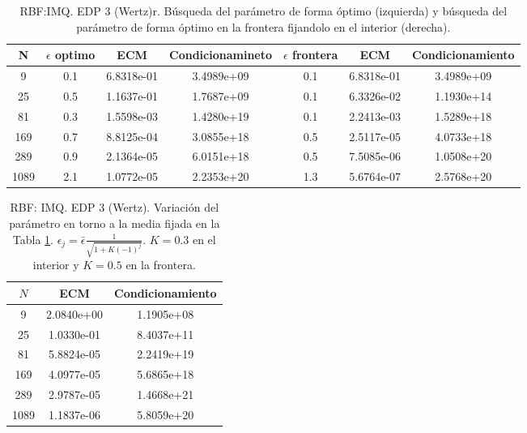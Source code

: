 \documentclass[11pt,a4paper]{article}
\begin{document}
\begin{table}
\begin{center}
\caption{RBF:IMQ.  EDP 3 (Wertz)r. Búsqueda del parámetro de forma óptimo (izquierda) y búsqueda del parámetro de forma óptimo en la frontera fijandolo en el interior (derecha).}
\begin{tabular}{|c|ccc|ccc|}
\hline 
N & $\epsilon$ optimo & ECM & Condicionamineto & $\epsilon$ frontera & ECM & Condicionamiento \\ 
\hline 
9 & 0.1 &6.8318e-01 & 3.4989e+09&0.1 &6.8318e-01   &3.4989e+09  \\ 
25 & 0.5& 1.1637e-01&1.7687e+09& 0.1&  6.3326e-02&1.1930e+14 \\
81&0.3& 1.5598e-03&1.4280e+19&0.1& 2.2413e-03 & 1.5289e+18  \\
169& 0.7&8.8125e-04& 3.0855e+18& 0.5& 2.5117e-05& 4.0733e+18\\
289&0.9& 2.1364e-05&6.0151e+18&0.5& 7.5085e-06& 1.0508e+20 \\
1089&2.1&1.0772e-05&2.2353e+20&1.3&5.6764e-07& 2.5768e+20 \\
\hline
\end{tabular} 
\label{EDP 3}
\end{center}
\end{table}


\begin{table}
\begin{center}
\caption{RBF: IMQ. EDP 3 (Wertz). Variación del parámetro en torno a la media fijada en la Tabla \ref{EDP 3}. $\epsilon_j=\bar{\epsilon} \frac{1}{\sqrt{1+K(-1)^j}}$. $K=0.3$ en el interior y $K=0.5$ en la frontera. }
\begin{tabular}{|c|cc|}
\hline
$N$ & ECM &Condicionamiento \\
\hline
9&2.0840e+00&1.1905e+08\\
25&1.0330e-01& 8.4037e+11 \\
81&5.8824e-05&2.2419e+19 \\
169&4.0977e-05& 5.6865e+18\\
289&2.9787e-05& 1.4668e+21 \\
1089&1.1837e-06 & 5.8059e+20\\
\hline
\end{tabular}
\end{center}
\end{table}
\end{document}
